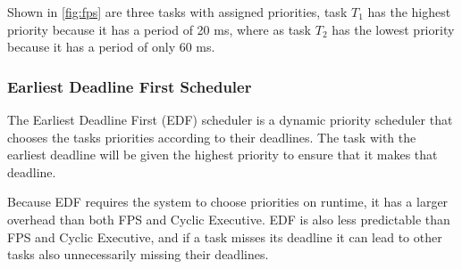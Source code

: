 Shown in \autoref{fig:fps} are three tasks with assigned priorities, task $T_1$ has the highest priority because it has a period of 20 ms, where as task $T_2$ has the lowest priority because it has a period of only 60 ms.

\subsubsection{Earliest Deadline First Scheduler}
The Earliest Deadline First (EDF) scheduler is a dynamic priority scheduler that chooses the tasks priorities according to their deadlines. The task with the earliest deadline will be given the highest priority to ensure that it makes that deadline.

Because EDF requires the system to choose priorities on runtime, it has a larger overhead than both FPS and Cyclic Executive. EDF is also less predictable than FPS and Cyclic Executive, and if a task misses its deadline it can lead to other tasks also unnecessarily missing their deadlines.